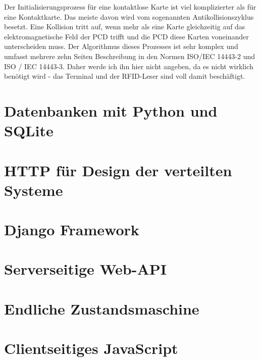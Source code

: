Der Initialisierungsprozess für eine kontaktlose Karte ist viel komplizierter als für eine Kontaktkarte. Das meiste davon wird vom sogenannten Antikollisionszyklus besetzt. Eine Kollision tritt auf, wenn mehr als eine Karte gleichzeitig auf das elektromagnetische Feld der PCD trifft und die PCD diese Karten voneinander unterscheiden muss. Der Algorithmus dieses Prozesses ist sehr komplex und umfasst mehrere zehn Seiten Beschreibung in den Normen ISO/IEC 14443-2 und ISO / IEC 14443-3. Daher werde ich ihn hier nicht angeben, da es nicht wirklich benötigt wird - das Terminal und der RFID-Leser sind voll damit beschäftigt.

\section{Datenbanken mit Python und SQLite}
\label{sec:theorie:db}

\section{HTTP für Design der verteilten Systeme}
\label{sec:theorie:http}

\section{Django Framework}
\label{sec:theorie:about_django}

\section{Serverseitige Web-API}
\label{sec:theorie:api}

\section{Endliche Zustandsmaschine}
\label{sec:theorie:fsm}

\section{Clientseitiges JavaScript}
\label{sec:theorie:js}




